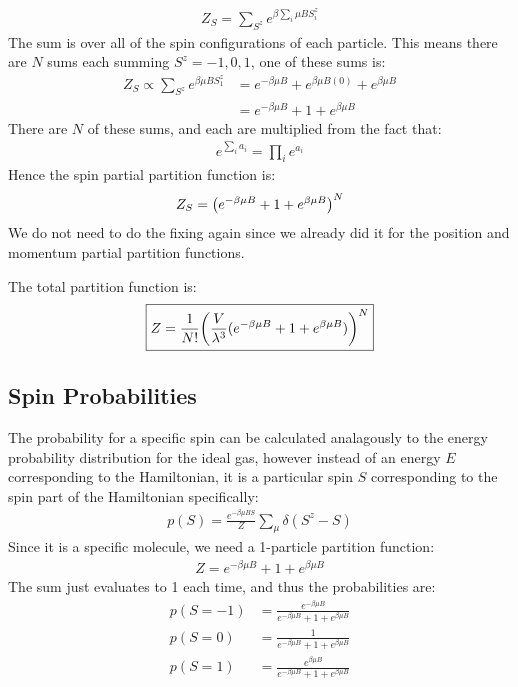 \documentclass[12pt]{article}
\begin{document}
\begin{align*}
  Z_S=\sum_{S^z}e^{\beta\sum_i\mu BS_i^z}
\end{align*}
The sum is over all of the spin configurations of each particle. This means there are $N$ sums each summing $S^z=-1,0,1$, one of these sums is:
\begin{align*}
  Z_S\propto\sum_{S^z}e^{\beta\mu BS^z_1}&=
  e^{-\beta\mu B}+e^{\beta\mu B(0)}+e^{\beta\mu B}\\
  &=e^{-\beta\mu B}+1+e^{\beta\mu B}
\end{align*}
There are $N$ of these sums, and each are multiplied from the fact that:
\begin{align*}
  e^{\sum_ia_i}=\prod_ie^{a_i}
\end{align*}
Hence the spin partial partition function is:
\begin{align*}
  Z_S=\qty(e^{-\beta\mu B}+1+e^{\beta\mu B})^N
\end{align*}
We do not need to do the fixing again since we already did it for the position and momentum partial partition functions.

The total partition function is:
\begin{align}
  \boxed{
    Z=\frac{1}{N!}\qty(\frac{V}{\lambda^3}(e^{-\beta\mu B}+1+e^{\beta\mu B}))^N
  }
\end{align}
\subsection{Spin Probabilities}
The probability for a specific spin can be calculated analagously to the energy probability distribution for the ideal gas, however instead of an energy $E$ corresponding to the Hamiltonian, it is a particular spin $S$ corresponding to the spin part of the Hamiltonian specifically:
\begin{align*}
  p(S)=\frac{e^{-\beta\mu B S}}{Z}\sum_\mu\delta(S^z-S)
\end{align*}
Since it is a specific molecule, we need a 1-particle partition function:
\begin{align*}
  Z=e^{-\beta\mu B}+1+e^{\beta\mu B}
\end{align*}
The sum just evaluates to 1 each time, and thus the probabilities are:
\begin{equation}
  \boxed{
  \begin{aligned}
    p(S=-1)&=\frac{e^{-\beta\mu B}}{e^{-\beta\mu B}+1+e^{\beta\mu B}}\\
    p(S= 0)&=\frac1{e^{-\beta\mu B}+1+e^{\beta\mu B}}\\
    p(S= 1)&=\frac{e^{\beta\mu B}}{e^{-\beta\mu B}+1+e^{\beta\mu B}}
  \end{aligned}
  }
\end{equation}
\end{document}
